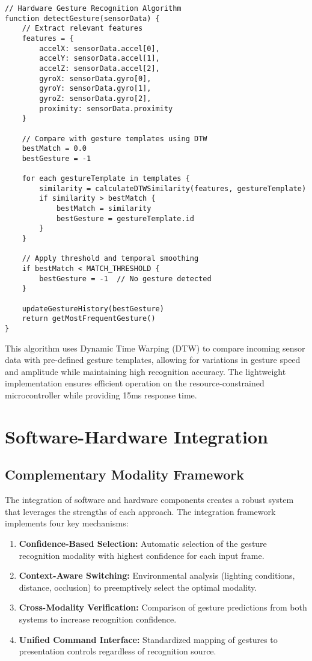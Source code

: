 \documentclass[arxiv,usenatbib]{iupartex}
\begin{document}
\begin{lstlisting}[style=codestyle]
// Hardware Gesture Recognition Algorithm
function detectGesture(sensorData) {
    // Extract relevant features
    features = {
        accelX: sensorData.accel[0],
        accelY: sensorData.accel[1],
        accelZ: sensorData.accel[2],
        gyroX: sensorData.gyro[0],
        gyroY: sensorData.gyro[1],
        gyroZ: sensorData.gyro[2],
        proximity: sensorData.proximity
    }
    
    // Compare with gesture templates using DTW
    bestMatch = 0.0
    bestGesture = -1
    
    for each gestureTemplate in templates {
        similarity = calculateDTWSimilarity(features, gestureTemplate)
        if similarity > bestMatch {
            bestMatch = similarity
            bestGesture = gestureTemplate.id
        }
    }
    
    // Apply threshold and temporal smoothing
    if bestMatch < MATCH_THRESHOLD {
        bestGesture = -1  // No gesture detected
    }
    
    updateGestureHistory(bestGesture)
    return getMostFrequentGesture()
}
\end{lstlisting}

This algorithm uses Dynamic Time Warping (DTW) to compare incoming sensor data with pre-defined gesture templates, allowing for variations in gesture speed and amplitude while maintaining high recognition accuracy. The lightweight implementation ensures efficient operation on the resource-constrained microcontroller while providing 15ms response time.

\section{Software-Hardware Integration}
\subsection{Complementary Modality Framework}
The integration of software and hardware components creates a robust system that leverages the strengths of each approach. The integration framework implements four key mechanisms:

\begin{enumerate}
  \item \textbf{Confidence-Based Selection:} Automatic selection of the gesture recognition modality with highest confidence for each input frame.
  
  \item \textbf{Context-Aware Switching:} Environmental analysis (lighting conditions, distance, occlusion) to preemptively select the optimal modality.
  
  \item \textbf{Cross-Modality Verification:} Comparison of gesture predictions from both systems to increase recognition confidence.
  
  \item \textbf{Unified Command Interface:} Standardized mapping of gestures to presentation controls regardless of recognition source.
\end{enumerate}
\end{document}
